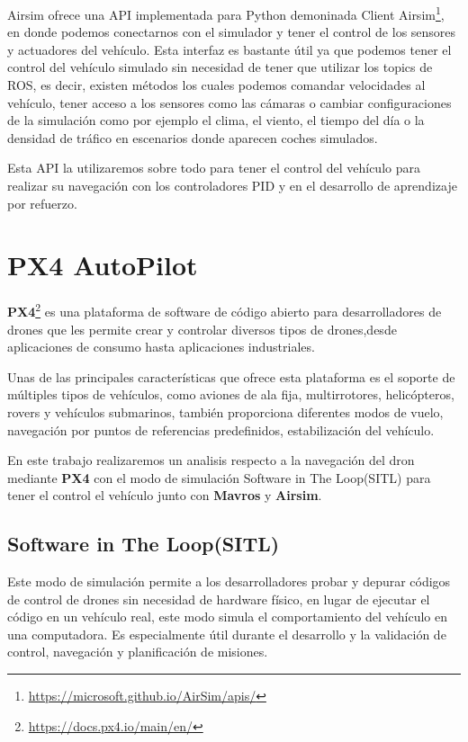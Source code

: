 Airsim ofrece una API implementada para Python demoninada Client Airsim\footnote{\url{https://microsoft.github.io/AirSim/apis/}}, en donde podemos conectarnos con el simulador y tener el control de los sensores y actuadores del vehículo. 
Esta interfaz es bastante útil ya que podemos tener el control del vehículo simulado sin necesidad de tener que utilizar los topics de ROS, es decir, existen métodos los cuales
podemos comandar velocidades al vehículo, tener acceso a los sensores como las cámaras o cambiar configuraciones de la simulación como por ejemplo el clima, el viento, el tiempo del día
o la densidad de tráfico en escenarios donde aparecen coches simulados. \newline

Esta API la utilizaremos sobre todo para tener el control del vehículo para realizar su navegación con los controladores PID y en 
el desarrollo de aprendizaje por refuerzo. 

\section{PX4 AutoPilot}
\label{sec:px4}

\textbf{PX4}\footnote{\url{https://docs.px4.io/main/en/}} es una plataforma de software de código abierto para desarrolladores de drones que les permite crear 
y controlar diversos tipos de drones,desde aplicaciones de consumo hasta aplicaciones industriales. \newline

Unas de las principales características que ofrece esta plataforma es el soporte de múltiples tipos de vehículos, como aviones de 
ala fija, multirrotores, helicópteros, rovers y vehículos submarinos, también proporciona diferentes modos de vuelo, 
navegación por puntos de referencias predefinidos, estabilización del vehículo. \newline

En este trabajo realizaremos un analisis respecto a la navegación del dron mediante \textbf{PX4} con el modo de simulación Software in The Loop(SITL) para tener el control el vehículo junto con 
\textbf{Mavros} y \textbf{Airsim}.\newline
\subsection{Software in The Loop(SITL)}
\label{sec:px4 sitl} 
Este modo de simulación permite a los desarrolladores probar y depurar códigos de control de drones sin necesidad de hardware físico, en lugar de ejecutar el código en un 
vehículo real, este modo simula el comportamiento del vehículo en una computadora. Es especialmente útil durante el desarrollo y la validación de control, navegación y 
planificación de misiones. \newline


